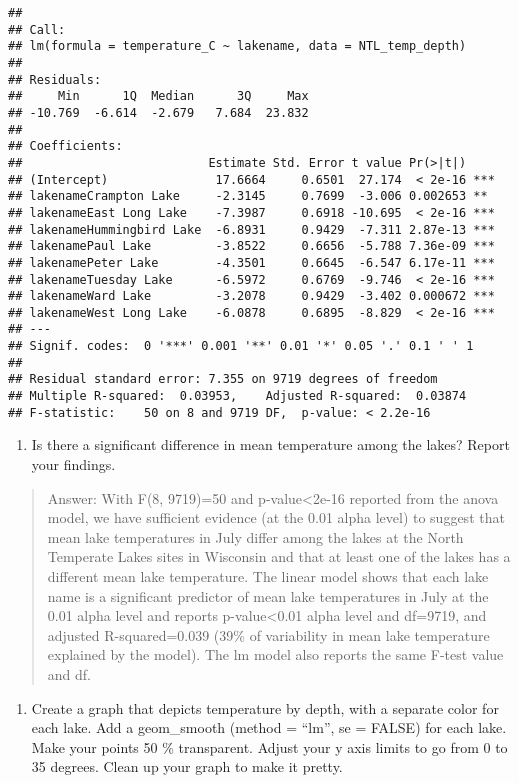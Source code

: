 \documentclass[
]{article}
\providecommand{\tightlist}{%
  \setlength{\itemsep}{0pt}\setlength{\parskip}{0pt}}
\begin{document}
\begin{verbatim}
## 
## Call:
## lm(formula = temperature_C ~ lakename, data = NTL_temp_depth)
## 
## Residuals:
##     Min      1Q  Median      3Q     Max 
## -10.769  -6.614  -2.679   7.684  23.832 
## 
## Coefficients:
##                          Estimate Std. Error t value Pr(>|t|)    
## (Intercept)               17.6664     0.6501  27.174  < 2e-16 ***
## lakenameCrampton Lake     -2.3145     0.7699  -3.006 0.002653 ** 
## lakenameEast Long Lake    -7.3987     0.6918 -10.695  < 2e-16 ***
## lakenameHummingbird Lake  -6.8931     0.9429  -7.311 2.87e-13 ***
## lakenamePaul Lake         -3.8522     0.6656  -5.788 7.36e-09 ***
## lakenamePeter Lake        -4.3501     0.6645  -6.547 6.17e-11 ***
## lakenameTuesday Lake      -6.5972     0.6769  -9.746  < 2e-16 ***
## lakenameWard Lake         -3.2078     0.9429  -3.402 0.000672 ***
## lakenameWest Long Lake    -6.0878     0.6895  -8.829  < 2e-16 ***
## ---
## Signif. codes:  0 '***' 0.001 '**' 0.01 '*' 0.05 '.' 0.1 ' ' 1
## 
## Residual standard error: 7.355 on 9719 degrees of freedom
## Multiple R-squared:  0.03953,    Adjusted R-squared:  0.03874 
## F-statistic:    50 on 8 and 9719 DF,  p-value: < 2.2e-16
\end{verbatim}

\begin{enumerate}
\def\labelenumi{\arabic{enumi}.}
\setcounter{enumi}{12}
\tightlist
\item
  Is there a significant difference in mean temperature among the lakes?
  Report your findings.
\end{enumerate}

\begin{quote}
Answer: With F(8, 9719)=50 and p-value\textless2e-16 reported from the
anova model, we have sufficient evidence (at the 0.01 alpha level) to
suggest that mean lake temperatures in July differ among the lakes at
the North Temperate Lakes sites in Wisconsin and that at least one of
the lakes has a different mean lake temperature. The linear model shows
that each lake name is a significant predictor of mean lake temperatures
in July at the 0.01 alpha level and reports p-value\textless0.01 alpha
level and df=9719, and adjusted R-squared=0.039 (39\% of variability in
mean lake temperature explained by the model). The lm model also reports
the same F-test value and df.
\end{quote}

\begin{enumerate}
\def\labelenumi{\arabic{enumi}.}
\setcounter{enumi}{13}
\tightlist
\item
  Create a graph that depicts temperature by depth, with a separate
  color for each lake. Add a geom\_smooth (method = ``lm'', se = FALSE)
  for each lake. Make your points 50 \% transparent. Adjust your y axis
  limits to go from 0 to 35 degrees. Clean up your graph to make it
  pretty.
\end{enumerate}
\end{document}
